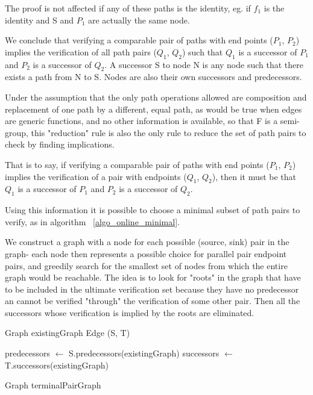 \documentclass[sigplan,review,anonymous]{acmart}
\begin{document}
{The proof is not affected if any of these paths is the identity, eg. if $f_1$ is the identity and S and $P_1$ are actually the same node.

We conclude that verifying a comparable pair of paths with end points ($P_1$, $P_2$) implies the verification of all path pairs ($Q_1$, $Q_2$) such that $Q_1$ is a successor of $P_1$ and $P_2$ is a successor of $Q_2$. A successor S to node N is any node such that there exists a path from N to S. Nodes are also their own successors and predecessors.

Under the assumption that the only path operations allowed are composition and replacement of one path by a different, equal path, as would be true when edges are generic functions, and no other information is available, so that F is a semi-group, this "reduction" rule is also the only rule to reduce the set of path pairs to check by finding implications.

That is to say, if verifying a comparable pair of paths with end points ($P_1$, $P_2$) implies the verification of a pair with endpoints ($Q_1$, $Q_2$), then it must be that $Q_1$ is a successor of $P_1$ and $P_2$ is a successor of $Q_2$. %

Using this information it is possible to choose a minimal subset of path pairs to verify, as in algorithm ~\ref{algo_online_minimal}.

We construct a graph with a node for each possible (source, sink) pair in the graph- each node then represents a possible choice for parallel pair endpoint pairs, and greedily search for the smallest set of nodes from which the entire graph would be reachable. The idea is to look for "roots" in the graph that have to be included in the ultimate verification set because they have no predecessor an cannot be verified "through" the verification of some other pair. Then all the successors whose verification is implied by the roots are eliminated.

\begin{algorithm}
\DontPrintSemicolon
{}
Graph existingGraph\;
Edge (S, T)\;
        
predecessors $\gets$ S.predecessors(existingGraph)\;
successors $\gets$ T.successors(existingGraph)\;

Graph terminalPairGraph\;


\end{algorithm}}
\end{document}
